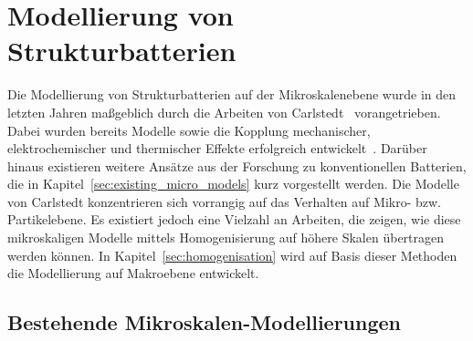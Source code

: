 \chapter{\label{sec:modelling_SB}Modellierung von Strukturbatterien}
Die Modellierung von Strukturbatterien auf der Mikroskalenebene wurde in den letzten Jahren maßgeblich durch die Arbeiten von Carlstedt~\cite{Carlstedt2018,Carlstedt2019,Carlstedt2022a,Carlstedt2023} vorangetrieben. Dabei wurden bereits Modelle sowie die Kopplung mechanischer, elektrochemischer und thermischer Effekte erfolgreich entwickelt~\cite{Carlstedt2022,Carlstedt2022b}. Darüber hinaus existieren weitere Ansätze aus der Forschung zu konventionellen Batterien, die in Kapitel~\ref{sec:existing_micro_models} kurz vorgestellt werden. Die Modelle von Carlstedt konzentrieren sich vorrangig auf das Verhalten auf Mikro- bzw. Partikelebene. Es existiert jedoch eine Vielzahl an Arbeiten, die zeigen, wie diese mikroskaligen Modelle mittels Homogenisierung auf höhere Skalen übertragen werden können. In Kapitel~\ref{sec:homogenisation} wird auf Basis dieser Methoden die Modellierung auf Makroebene entwickelt.

\section{\label{sec:existing_micro_models}Bestehende Mikroskalen-Modellierungen}

